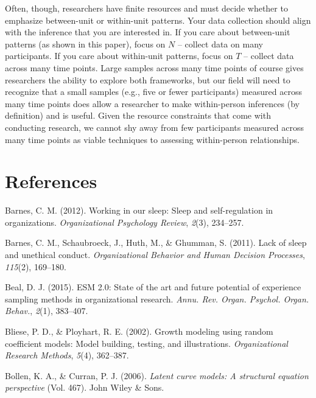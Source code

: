 \documentclass[english,,man]{apa6}
\theoremstyle{definition}
\theoremstyle{definition}
\theoremstyle{definition}
\theoremstyle{remark}
\begin{document}
Often, though, researchers have finite resources and must decide whether
to emphasize between-unit or within-unit patterns. Your data collection
should align with the inference that you are interested in. If you care
about between-unit patterns (as shown in this paper), focus on \(N\) --
collect data on many participants. If you care about within-unit
patterns, focus on \(T\) -- collect data across many time points. Large
samples across many time points of course gives researchers the ability
to explore both frameworks, but our field will need to recognize that a
small samples (e.g., five or fewer participants) measured across many
time points does allow a researcher to make within-person inferences (by
definition) and is useful. Given the resource constraints that come with
conducting research, we cannot shy away from few participants measured
across many time points as viable techniques to assessing within-person
relationships.

\newpage

\hypertarget{references}{%
\section{References}\label{references}}

\setlength{\parindent}{-0.5in}
\setlength{\leftskip}{0.5in}

\hypertarget{refs}{}
\leavevmode\hypertarget{ref-barnes2012working}{}%
Barnes, C. M. (2012). Working in our sleep: Sleep and self-regulation in
organizations. \emph{Organizational Psychology Review}, \emph{2}(3),
234--257.

\leavevmode\hypertarget{ref-barnes_lack_2011}{}%
Barnes, C. M., Schaubroeck, J., Huth, M., \& Ghumman, S. (2011). Lack of
sleep and unethical conduct. \emph{Organizational Behavior and Human
Decision Processes}, \emph{115}(2), 169--180.

\leavevmode\hypertarget{ref-beal_esm_2015}{}%
Beal, D. J. (2015). ESM 2.0: State of the art and future potential of
experience sampling methods in organizational research. \emph{Annu. Rev.
Organ. Psychol. Organ. Behav.}, \emph{2}(1), 383--407.

\leavevmode\hypertarget{ref-bliese_growth_2002}{}%
Bliese, P. D., \& Ployhart, R. E. (2002). Growth modeling using random
coefficient models: Model building, testing, and illustrations.
\emph{Organizational Research Methods}, \emph{5}(4), 362--387.

\leavevmode\hypertarget{ref-bollen2006latent}{}%
Bollen, K. A., \& Curran, P. J. (2006). \emph{Latent curve models: A
structural equation perspective} (Vol. 467). John Wiley \& Sons.
\end{document}
